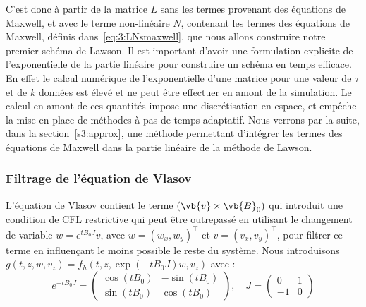 C'est donc à partir de la matrice $L$ sans les termes provenant des équations de Maxwell, et avec le terme non-linéaire $N$, contenant les termes des équations de Maxwell, définis dans~\eqref{eq:3:LNsmaxwell}, que nous allons construire notre premier schéma de Lawson. Il est important d'avoir une formulation explicite de l'exponentielle de la partie linéaire pour construire un schéma en temps efficace. En effet le calcul numérique de l'exponentielle d'une matrice pour une valeur de $\tau$ et de $k$ données est élevé et ne peut être effectuer en amont de la simulation. Le calcul en amont de ces quantités impose une discrétisation en espace, et empêche la mise en place de méthodes à pas de temps adaptatif. Nous verrons par la suite, dans la section~\ref{s3:approx}, une méthode permettant d'intégrer les termes des équations de Maxwell dans la partie linéaire de la méthode de Lawson.

\subsubsection{Filtrage de l'équation de Vlasov}

L'équation de Vlasov contient le terme $(\vb{v}\times\vb{B}_0)$ qui introduit une condition de CFL restrictive qui peut être outrepassé en utilisant le changement de variable $w=e^{tB_0J}v$, avec $w=(w_x,w_y)^\top$ et $v=(v_x,v_y)^\top$, pour filtrer ce terme en influençant le moins possible le reste du système. Nous introduisons $g(t,z,w,v_z) = f_h(t,z,\exp(-tB_0J)w,v_z)$ avec :
$$
  e^{-tB_0J} = \begin{pmatrix}
    \cos(tB_0) & -\sin(tB_0) \\
    \sin(tB_0) &  \cos(tB_0)
  \end{pmatrix},
  \quad
  J = \begin{pmatrix}
    0  & 1 \\
    -1 & 0
  \end{pmatrix}
$$


